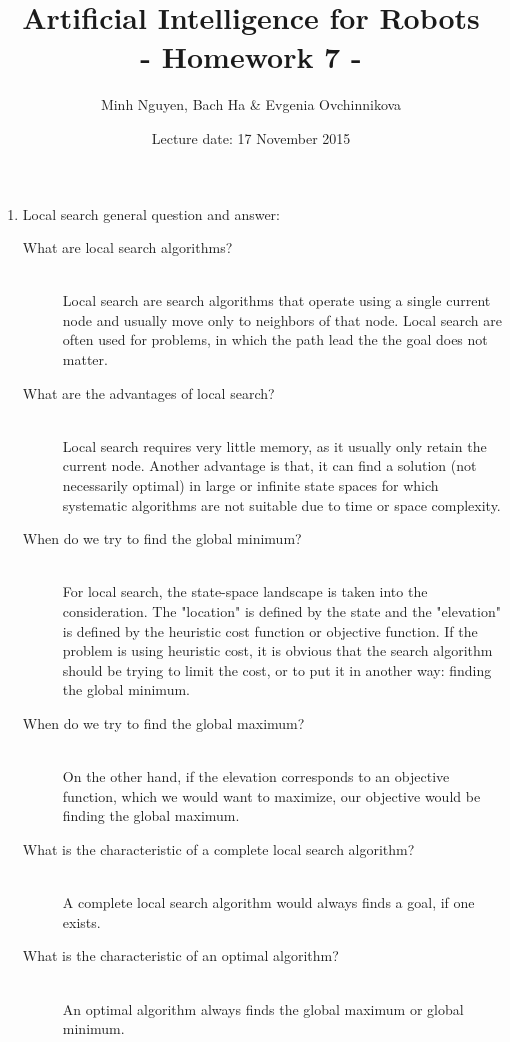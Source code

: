 \documentclass[a4paper, 12pt]{article}
\title{Artificial Intelligence for Robots \\
				- Homework 7 -}
\author{Minh Nguyen, Bach Ha \& Evgenia Ovchinnikova}
\date{Lecture date: 17 November 2015}
\begin{document}
\maketitle

    \begin{enumerate}

    \item Local search general question and answer:
    	\begin{description}
  		\item[What are local search algorithms?] \hfill \\
  			Local search are search algorithms that operate using a single current node and usually move only to neighbors of that node. Local search are often used for problems, in which the path lead the the goal does not matter.
  			
  		\item[What are the advantages of local search?] \hfill \\
  			Local search requires very little memory, as it usually only retain the current node. Another advantage is that, it can find a solution (not necessarily optimal) in large or infinite state spaces for which systematic algorithms are not suitable due to time or space complexity.
  			
  		\item[When do we try to find the global minimum?] \hfill \\
  			For local search, the state-space landscape is taken into the consideration. The "location" is defined by the state and the "elevation" is defined by the heuristic cost function or objective function. If the problem is using heuristic cost, it is obvious that the search algorithm should be trying to limit the cost, or to put it in another way: finding the global minimum.

  		\item[When do we try to find the global maximum?] \hfill \\
			On the other hand, if the elevation corresponds to an objective function, which we would want to maximize, our objective would be finding the global maximum.
			
		\item[What is the characteristic of a complete local search algorithm?]	\hfill \\	
			A complete local search algorithm would always finds a goal, if one exists.	

		\item[What is the characteristic of  an optimal algorithm?]		\hfill \\
			An optimal algorithm always finds the global maximum or global minimum.
			

\end{description}
\end{enumerate}
\end{document}

